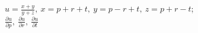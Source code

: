 \item $u = \frac{x + y}{y + z}, \ x = p + r + t, \ y = p - r + t, \ z = p + r - t$; \\
$\frac{\partial u}{\partial p}, \ \frac{\partial u}{\partial r}, \ \frac{\partial u}{\partial t}$
